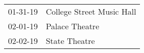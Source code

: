 \begin{supertabular}{p{0.07\textwidth}p{0.23\textwidth}}
 01-31-19 &  College Street Music Hall \\
 02-01-19 &             Palace Theatre \\
 02-02-19 &              State Theatre \\
\end{supertabular}
